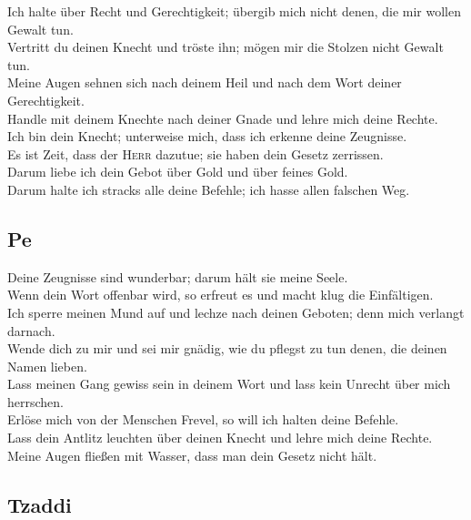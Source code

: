  Ich halte über Recht und Gerechtigkeit; übergib mich
nicht denen, die mir wollen Gewalt tun.\\
 Vertritt du deinen Knecht und tröste ihn; mögen mir die
Stolzen nicht Gewalt tun.\\
 Meine Augen sehnen sich nach deinem Heil und nach dem
Wort deiner Gerechtigkeit.\\
 Handle mit deinem Knechte nach deiner Gnade und lehre
mich deine Rechte.\\
 Ich bin dein Knecht; unterweise mich, dass ich erkenne
deine Zeugnisse.\\
 Es ist Zeit, dass der \textsc{Herr} dazutue; sie haben
dein Gesetz zerrissen.\\
 Darum liebe ich dein Gebot über Gold und über feines
Gold.\\
 Darum halte ich stracks alle deine Befehle; ich hasse
allen falschen Weg.

\hypertarget{pe}{%
\subsection{Pe}\label{pe}}

 Deine Zeugnisse sind wunderbar; darum hält sie meine
Seele.\\
 Wenn dein Wort offenbar wird, so erfreut es und macht
klug die Einfältigen.\\
 Ich sperre meinen Mund auf und lechze nach deinen
Geboten; denn mich verlangt darnach.\\
 Wende dich zu mir und sei mir gnädig, wie du pflegst zu
tun denen, die deinen Namen lieben.\\
 Lass meinen Gang gewiss sein in deinem Wort und lass
kein Unrecht über mich herrschen.\\
 Erlöse mich von der Menschen Frevel, so will ich halten
deine Befehle.\\
 Lass dein Antlitz leuchten über deinen Knecht und lehre
mich deine Rechte.\\
 Meine Augen fließen mit Wasser, dass man dein Gesetz
nicht hält.

\hypertarget{tzaddi}{%
\subsection{Tzaddi}\label{tzaddi}}

